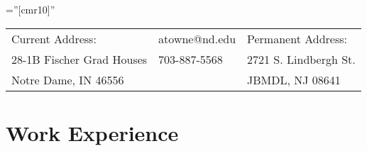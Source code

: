 \documentclass[a4paper,10pt]{article} %
\begin{document}
\pagestyle{empty} %

\font\fb=''[cmr10]'' %


\par{\bigskip\par} %


\begin{tabularx}{\textwidth}{XZY}
    Current Address: & atowne@nd.edu & Permanent Address:\\
    28-1B Fischer Grad Houses & 703-887-5568 & 2721 S. Lindbergh St.\\
    Notre Dame, IN 46556 & & JBMDL, NJ 08641
\end{tabularx}


\section{Work Experience}
\end{document}
